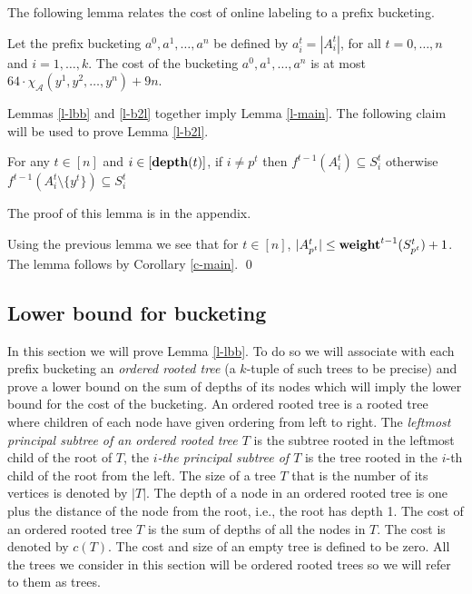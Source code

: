 \documentclass[runningheads,a4paper]{llncs}
\newcommand{\A}{\mathcal{A}}
\newcommand{\weight}{{\rm {\bf weight}}}
\newcommand{\depth}{{\rm {\bf depth}}}
\newenvironment{proofof}[1]{\noindent{\it Proof of #1. }} {{\qed}}
\begin{document}
The following lemma relates the cost of online labeling to a prefix bucketing.
 
\begin{lemma}\label{l-b2l}
Let the prefix bucketing $a^0,a^1,\dots,a^n$ be defined by $a^t_i = |A^t_i|$, for all $t=0,\dots,n$ and $i=1,\dots,k$.
The cost of the bucketing $a^0,a^1,\dots,a^n$ is at most $64 \cdot \chi_\A(y^1,y^2,\dots,y^n) + 9n$.
\end{lemma}

Lemmas \ref{l-lbb} and \ref{l-b2l} together imply Lemma \ref{l-main}. The following claim will be used to prove Lemma  \ref{l-b2l}.

\begin{lemma}\label{l-p2}
For any $t\in[n]$ and $i\in [\depth(t)]$,  if $i\not=p^t$ then $f^{t-1}(A^t_i) \subseteq S^t_i$ otherwise
$f^{t-1}(A^t_i \setminus \{y^t\}) \subseteq S^t_i$ 
\end{lemma}

The proof of this lemma is in the appendix.

\begin{proofof}{Lemma \ref{l-b2l}}
Using the previous lemma we see that for $t\in [n]$, $|A^t_{p^t}| \le \weight^{t-1}(S^t_{p^t}) + 1$.
The lemma follows by Corollary \ref{c-main}.
\end{proofof}


\subsection{Lower bound for bucketing}\label{s-lbb}

In this section we will prove Lemma \ref{l-lbb}. To do so we will associate with each prefix bucketing an \emph{ordered rooted tree} (a $k$-tuple of such trees to be precise) 
and prove a lower bound on the sum of depths of its nodes which will imply the lower bound for the cost of the bucketing.
An ordered rooted tree is a rooted tree where children of each node have given ordering from left to right.
The \emph{leftmost principal subtree of an ordered rooted tree $T$} is the subtree rooted in the leftmost child of the root of $T$, the \emph{$i$-the principal subtree of $T$} is the 
tree rooted in the $i$-th child of the root from the left. The size of a tree $T$ that is the number 
of its vertices is denoted by $|T|$. The depth of a node in an ordered rooted tree is one plus the distance of the node from the root, i.e., the root has depth 1. The cost
of an ordered rooted tree $T$ is the sum of depths of all the nodes in $T$. The cost is denoted by $c(T)$. The cost and size of an empty tree is defined to be zero.
All the trees we consider in this section will be ordered rooted trees so we will refer to them as trees.
\end{document}

